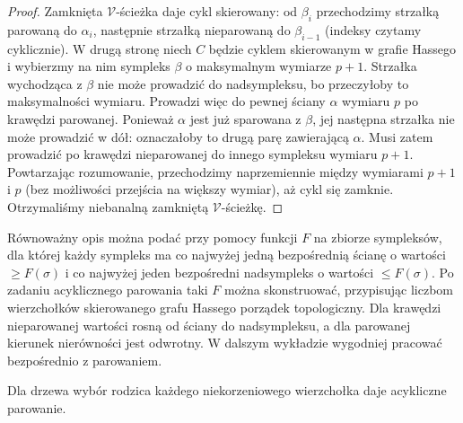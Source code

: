 \begin{proof}
Zamknięta $\mathcal V$-ścieżka daje cykl skierowany:
od $\beta_i$ przechodzimy strzałką parowaną do
$\alpha_i$, następnie strzałką nieparowaną do
$\beta_{i-1}$ (indeksy czytamy cyklicznie).
W drugą stronę niech $C$ będzie cyklem skierowanym
w grafie Hassego i wybierzmy na nim sympleks $\beta$
o maksymalnym wymiarze $p+1$. Strzałka wychodząca
z $\beta$ nie może prowadzić do nadsympleksu,
bo przeczyłoby to maksymalności wymiaru. Prowadzi
więc do pewnej ściany $\alpha$ wymiaru $p$ po
krawędzi parowanej. Ponieważ $\alpha$ jest już
sparowana z $\beta$, jej następna strzałka nie może
prowadzić w dół: oznaczałoby to drugą parę zawierającą
$\alpha$. Musi zatem prowadzić po krawędzi
nieparowanej do innego sympleksu wymiaru $p+1$.
Powtarzając rozumowanie, przechodzimy naprzemiennie
między wymiarami $p+1$ i $p$ (bez możliwości przejścia
na większy wymiar), aż cykl się zamknie. Otrzymaliśmy
niebanalną zamkniętą $\mathcal V$-ścieżkę.
\end{proof}

\begin{uwaga}
Równoważny opis można podać przy pomocy funkcji
$F$ na zbiorze sympleksów, dla której każdy sympleks
ma co najwyżej jedną bezpośrednią ścianę o wartości
$\ge F(\sigma)$ i co najwyżej jeden bezpośredni
nadsympleks o wartości $\le F(\sigma)$.
Po zadaniu acyklicznego parowania taki $F$ można
skonstruować, przypisując liczbom wierzchołków
skierowanego grafu Hassego porządek topologiczny.
Dla krawędzi nieparowanej wartości rosną od ściany
do nadsympleksu, a dla parowanej kierunek nierówności
jest odwrotny. W dalszym wykładzie wygodniej
pracować bezpośrednio z parowaniem.
\end{uwaga}

\begin{samepage}
\begin{center}
\begin{minipage}{.96\linewidth}\centering
{}\par\smallskip

{\footnotesize Dla drzewa wybór rodzica każdego niekorzeniowego
wierzchołka daje acykliczne parowanie.}
\end{minipage}
\end{center}
\end{samepage}

